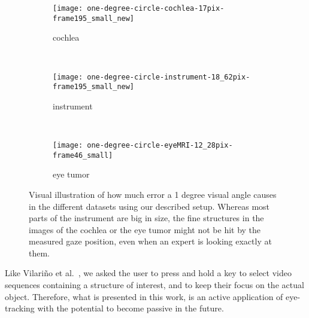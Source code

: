 \begin{figure}[ht]
	\centering
	\begin{subfigure}[h]{0.31\textwidth}
		\texttt{[image: one-degree-circle-cochlea-17pix-frame195\_small\_new]}	
		\caption*{cochlea}
	\end{subfigure}
	~
	\begin{subfigure}[h]{0.31\textwidth}
		\texttt{[image: one-degree-circle-instrument-18\_62pix-frame195\_small\_new]}
		\caption*{instrument}
	\end{subfigure}
	~
	\begin{subfigure}[h]{0.31\textwidth}
		\texttt{[image: one-degree-circle-eyeMRI-12\_28pix-frame46\_small]}	
		\caption*{eye tumor}
	\end{subfigure}
	\caption{Visual illustration of how much error a 1 degree visual angle causes in the different datasets using our described setup. Whereas most parts of the instrument are big in size, the fine structures in the images of the cochlea or the eye tumor might not be hit by the measured gaze position, even when an expert is looking exactly at them.}
	\label{fig:onedegreecircle}
\end{figure}

Like Vilari\~no et al.\ \cite{vilarino2007automatic}, we asked the user to press and hold a key to select video sequences containing a structure of interest, and to keep their focus on the actual object. 
Therefore, what is presented in this work, is an active application of eye-tracking with the potential to become passive in the future.

